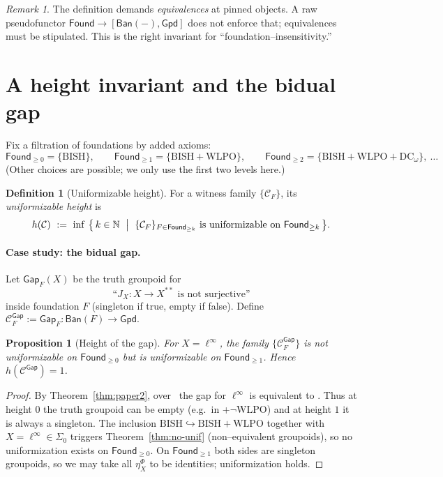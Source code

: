 \documentclass[11pt]{article}
\newtheorem{proposition}[theorem]{Proposition}
\theoremstyle{definition}
\newtheorem{definition}[theorem]{Definition}
\theoremstyle{remark}
\newtheorem{remark}[theorem]{Remark}
\newcommand{\N}{\mathbb{N}}
\newcommand{\linf}{\ell^\infty}
\newcommand{\WLPO}{\mathrm{WLPO}}
\newcommand{\BISH}{\mathrm{BISH}}
\newcommand{\Found}{\mathsf{Found}}
\newcommand{\Ban}{\mathsf{Ban}}
\newcommand{\Gpd}{\mathsf{Gpd}}
\newcommand{\SigmaZero}{\Sigma_{0}}
\begin{document}
\begin{remark}
The definition demands \emph{equivalences} at pinned objects. A raw pseudofunctor \(\Found\to[\Ban(-),\Gpd]\) does not enforce that; equivalences must be stipulated. This is the right invariant for “foundation--insensitivity.”
\end{remark}

\section{A height invariant and the bidual gap}\label{sec:height}

Fix a filtration of foundations by added axioms:
\[
\Found_{\ge 0}=\{\BISH\},\qquad
\Found_{\ge 1}=\{\BISH+\WLPO\},\qquad
\Found_{\ge 2}=\{\BISH+\WLPO+\mathrm{DC}_\omega\},\ \ldots
\]
(Other choices are possible; we only use the first two levels here.)

\begin{definition}[Uniformizable height]
For a witness family \(\{\mathcal C_F\}\), its \emph{uniformizable height} is
\[
  h(\mathcal C)\ :=\ \inf\ \bigl\{\,k\in\N\ \bigm|\ 
    \{\mathcal C_F\}_{F\in \Found_{\ge k}} \text{ is uniformizable on }\Found_{\ge k}\,\bigr\}.
\]
\end{definition}

\paragraph{Case study: the bidual gap.}
Let \(\mathsf{Gap}_F(X)\) be the truth groupoid for
\[
  \text{``$J_X:X\to X^{**}$ is not surjective''}
\]
inside foundation \(F\) (singleton if true, empty if false). Define
\(
 \mathcal C^{\mathsf{Gap}}_F:=\mathsf{Gap}_F:\Ban(F)\to\Gpd.
\)

\begin{proposition}[Height of the gap]\label{prop:gap-height}
For \(X=\linf\), the family \(\{\mathcal C^{\mathsf{Gap}}_F\}\) is not uniformizable on \(\Found_{\ge 0}\) but is uniformizable on \(\Found_{\ge 1}\). Hence \(h(\mathcal C^{\mathsf{Gap}})=1\).
\end{proposition}

\begin{proof}
By Theorem~\ref{thm:paper2}, over \BISH\ the gap for \(\linf\) is equivalent to \WLPO. Thus at height \(0\) the truth groupoid can be empty (e.g.\ in \BISH+\(\neg\WLPO\)) and at height \(1\) it is always a singleton. The inclusion \(\BISH\hookrightarrow\BISH+\WLPO\) together with \(X=\linf\in\SigmaZero\) triggers Theorem~\ref{thm:no-unif} (non--equivalent groupoids), so no uniformization exists on \(\Found_{\ge 0}\). On \(\Found_{\ge 1}\) both sides are singleton groupoids, so we may take all \(\eta^\Phi_X\) to be identities; uniformization holds.
\end{proof}
\end{document}
